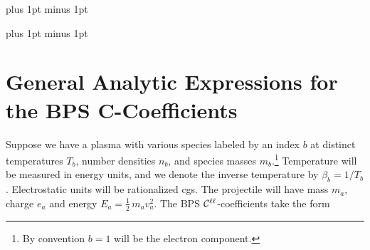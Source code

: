 \documentclass[preprint,12pt,eqsecnum,nofootinbib,amsmath,amssymb]{revtex4}
\newcommand{\bodyskip}{\baselineskip 18pt plus 1pt minus 1pt}
\newcommand{\tableofcontentsskip}{\baselineskip 14pt plus 1pt minus 1pt}
\begin{document}
\pagebreak
\tableofcontentsskip
\tableofcontents

\newpage
\bodyskip

\pagebreak
\clearpage

\section{General Analytic Expressions for the BPS C-Coefficients}

Suppose we have a plasma with various species labeled by an index $b$
at distinct temperatures $T_b$, number densities $n_b$, and species
masses $m_b$.\footnote{By convention $b=1$ will be the electron
component.}  Temperature will be measured in energy units, and we
denote the inverse temperature by $\beta_b =1/T_b$. Electrostatic
units will be rationalized cgs. The projectile will have mass $m_a$,
charge $e_a$ and energy $E_a = \frac{1}{2}\, m_a v_a^2$.  The BPS
${\cal C^{\ell\ell}}$-coefficients take the form
\end{document}
